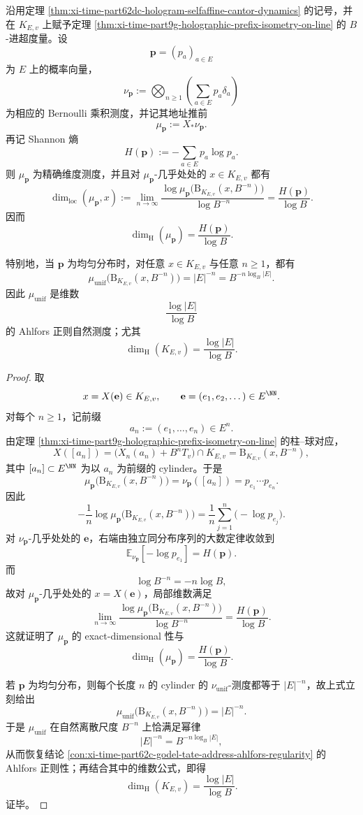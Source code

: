\begin{theorem}\label{thm:xi-time-part62dc-hologram-bernoulli-exact-dimensional}
沿用定理 \ref{thm:xi-time-part62dc-hologram-selfaffine-cantor-dynamics} 的记号，并在 \(K_{E,v}\) 上赋予定理 \ref{thm:xi-time-part9g-holographic-prefix-isometry-on-line} 的 \(B\)-进超度量。设
\[
\mathbf p=(p_a)_{a\in E}
\]
为 \(E\) 上的概率向量，
\[
\nu_{\mathbf p}:=
\bigotimes_{n\ge 1}\left(\sum_{a\in E}p_a\delta_a\right)
\]
为相应的 Bernoulli 乘积测度，并记其地址推前
\[
\mu_{\mathbf p}:=X_*\nu_{\mathbf p}.
\]
再记 Shannon 熵
\[
H(\mathbf p):=-\sum_{a\in E}p_a\log p_a.
\]
则 \(\mu_{\mathbf p}\) 为精确维度测度，并且对 \(\mu_{\mathbf p}\)-几乎处处的 \(x\in K_{E,v}\) 都有
\[
\dim_{\mathrm{loc}}(\mu_{\mathbf p},x)
:=
\lim_{n\to\infty}
\frac{\log \mu_{\mathbf p}\!\bigl(\mathrm B_{K_{E,v}}(x,B^{-n})\bigr)}{\log B^{-n}}
=
\frac{H(\mathbf p)}{\log B}.
\]
因而
\[
\dim_{\mathrm H}(\mu_{\mathbf p})=\frac{H(\mathbf p)}{\log B}.
\]

特别地，当 \(\mathbf p\) 为均匀分布时，对任意 \(x\in K_{E,v}\) 与任意 \(n\ge 1\)，都有
\[
\mu_{\mathrm{unif}}\!\bigl(\mathrm B_{K_{E,v}}(x,B^{-n})\bigr)
=
|E|^{-n}
=
B^{-n\log_B|E|}.
\]
因此 \(\mu_{\mathrm{unif}}\) 是维数
\[
\frac{\log |E|}{\log B}
\]
的 Ahlfors 正则自然测度；尤其
\[
\dim_{\mathrm H}(K_{E,v})=\frac{\log |E|}{\log B}.
\]
\end{theorem}
\begin{proof}
取
\[
x=X(\mathbf e)\in K_{E,v},
\qquad
\mathbf e=(e_1,e_2,\dots)\in E^{\NN}.
\]
对每个 \(n\ge 1\)，记前缀
\[
a_n:=(e_1,\dots,e_n)\in E^n.
\]
由定理 \ref{thm:xi-time-part9g-holographic-prefix-isometry-on-line} 的柱--球对应，
\[
X([a_n])
=
\bigl(X_n(a_n)+B^nT_v\bigr)\cap K_{E,v}
=
\mathrm B_{K_{E,v}}(x,B^{-n}),
\]
其中 \([a_n]\subset E^{\NN}\) 为以 \(a_n\) 为前缀的 cylinder。于是
\[
\mu_{\mathbf p}\!\bigl(\mathrm B_{K_{E,v}}(x,B^{-n})\bigr)
=
\nu_{\mathbf p}([a_n])
=
p_{e_1}\cdots p_{e_n}.
\]
因此
\[
-\frac{1}{n}\log
\mu_{\mathbf p}\!\bigl(\mathrm B_{K_{E,v}}(x,B^{-n})\bigr)
=
\frac1n\sum_{j=1}^{n}\bigl(-\log p_{e_j}\bigr).
\]
对 \(\nu_{\mathbf p}\)-几乎处处的 \(\mathbf e\)，右端由独立同分布序列的大数定律收敛到
\[
\mathbb E_{\nu_{\mathbf p}}[-\log p_{e_1}]
=
H(\mathbf p).
\]
而
\[
\log B^{-n}=-n\log B,
\]
故对 \(\mu_{\mathbf p}\)-几乎处处的 \(x=X(\mathbf e)\)，局部维数满足
\[
\lim_{n\to\infty}
\frac{\log \mu_{\mathbf p}\!\bigl(\mathrm B_{K_{E,v}}(x,B^{-n})\bigr)}{\log B^{-n}}
=
\frac{H(\mathbf p)}{\log B}.
\]
这就证明了 \(\mu_{\mathbf p}\) 的 exact-dimensional 性与
\[
\dim_{\mathrm H}(\mu_{\mathbf p})=\frac{H(\mathbf p)}{\log B}.
\]

若 \(\mathbf p\) 为均匀分布，则每个长度 \(n\) 的 cylinder 的 \(\nu_{\mathrm{unif}}\)-测度都等于 \(|E|^{-n}\)，故上式立刻给出
\[
\mu_{\mathrm{unif}}\!\bigl(\mathrm B_{K_{E,v}}(x,B^{-n})\bigr)=|E|^{-n}.
\]
于是 \(\mu_{\mathrm{unif}}\) 在自然离散尺度 \(B^{-n}\) 上恰满足幂律
\[
|E|^{-n}=B^{-n\log_B|E|},
\]
从而恢复结论 \ref{con:xi-time-part62c-godel-tate-address-ahlfors-regularity} 的 Ahlfors 正则性；再结合其中的维数公式，即得
\[
\dim_{\mathrm H}(K_{E,v})=\frac{\log |E|}{\log B}.
\]
证毕。
\end{proof}

